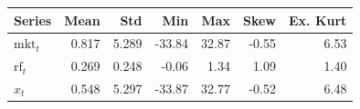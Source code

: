 \begin{tabular}{lrrrrrr}\toprule
Series & Mean & Std & Min & Max & Skew & Ex. Kurt \\\midrule
$\text{mkt}_t$ & 0.817 & 5.289 & -33.84 & 32.87 & -0.55 & 6.53 \\
$\text{rf}_t$ & 0.269 & 0.248 & -0.06 & 1.34 & 1.09 & 1.40 \\
$x_t$ & 0.548 & 5.297 & -33.87 & 32.77 & -0.52 & 6.48 \\
\bottomrule\end{tabular}
